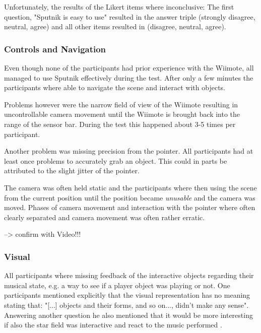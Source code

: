 \documentclass[10pt,a4paper]{scrartcl}
\begin{document}
Unfortunately, the results of the Likert items where inconclusive: The first question, "Sputnik is easy to use" resulted in the answer triple (strongly disagree, neutral, agree) and all other items resulted in (disagree, neutral, agree).



\subsubsection{Controls and Navigation}
Even though none of the participants had prior experience with the Wiimote, all managed to use Sputnik effectively during the test. After only a few minutes the participants where able to navigate the scene and interact with objects. 

Problems however were the narrow field of view of the Wiimote resulting in uncontrollable camera movement until the Wiimote is brought back into the range of the sensor bar. During the test this happened about 3-5 times per participant. 

Another problem was missing precision from the pointer. All participants had at least once problems to accurately grab an object. This could in parts be attributed to the slight jitter of the pointer.

The camera was often held static and the participants where then using the scene from the current position until the position became \emph{unusable} and the camera was moved. Phases of camera movement and interaction with the pointer where often clearly separated and camera movement was often rather erratic.

--> confirm with Video!!!



\subsubsection{Visual}
All participants where missing feedback of the interactive objects regarding their musical state, e.g. a way to see if a player object was playing or not. One participants mentioned explicitly that the visual representation has no meaning stating that: "[...] objects and their forms, and so on..., didn't make any sense". Answering another question he also mentioned that it would be more interesting if also the star field was interactive and react to the music performed .
\end{document}
